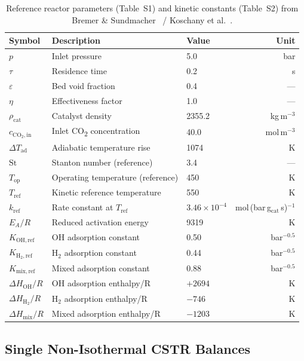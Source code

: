 \documentclass[11pt,a4paper]{article}
\newcommand{\dTad}{\Delta T_{\mathrm{ad}}}
\newcommand{\Top}{T_{\mathrm{op}}}
\newcommand{\St}{\mathrm{St}}
\newcommand{\cin}{c_{\mathrm{CO_2,in}}}
\begin{document}
\begin{table}[h!]
\centering
\caption{Reference reactor parameters (Table~S1) and kinetic constants (Table~S2)
         from Bremer \& Sundmacher~\cite{bremer2021} / Koschany et al.~\cite{koschany2016}.}
\label{tab:params}
\renewcommand{\arraystretch}{1.18}
\begin{tabular}{@{}lllr@{}}
\toprule
Symbol & Description & Value & Unit \\
\midrule
$p$ & Inlet pressure & 5.0 & bar \\
$\tau$ & Residence time & 0.2 & s \\
$\varepsilon$ & Bed void fraction & 0.4 & --- \\
$\eta$ & Effectiveness factor & 1.0 & --- \\
$\rho_{\mathrm{cat}}$ & Catalyst density & 2355.2 & kg\,m$^{-3}$ \\
$\cin$ & Inlet CO\textsubscript{2} concentration & 40.0 & mol\,m$^{-3}$ \\
$\dTad$ & Adiabatic temperature rise & 1074 & K \\
$\St$ & Stanton number (reference) & 3.4 & --- \\
$\Top$ & Operating temperature (reference) & 450 & K \\
\midrule
$T_{\mathrm{ref}}$ & Kinetic reference temperature & 550 & K \\
$k_{\mathrm{ref}}$ & Rate constant at $T_\mathrm{ref}$ & $3.46\times10^{-4}$ & mol\,(bar\,g$_\mathrm{cat}$\,s)$^{-1}$ \\
$E_A/R$ & Reduced activation energy & 9319 & K \\
$K_{\mathrm{OH,ref}}$ & OH adsorption constant & 0.50 & bar$^{-0.5}$ \\
$K_{\mathrm{H_2,ref}}$ & H$_2$ adsorption constant & 0.44 & bar$^{-0.5}$ \\
$K_{\mathrm{mix,ref}}$ & Mixed adsorption constant & 0.88 & bar$^{-0.5}$ \\
$\Delta H_{\mathrm{OH}}/R$ & OH adsorption enthalpy/R & $+2694$ & K \\
$\Delta H_{\mathrm{H_2}}/R$ & H$_2$ adsorption enthalpy/R & $-746$ & K \\
$\Delta H_{\mathrm{mix}}/R$ & Mixed adsorption enthalpy/R & $-1203$ & K \\
\bottomrule
\end{tabular}
\end{table}

\subsection{Single Non-Isothermal CSTR Balances}
\label{sec:single}
\end{document}
